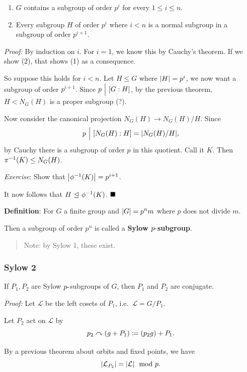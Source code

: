 \begin{enumerate}
\def\labelenumi{\arabic{enumi}.}
\tightlist
\item
  \(G\) contains a subgroup of order \(p^i\) for every
  \(1 \leq i \leq n\).
\item
  Every subgroup \(H\) of order \(p^i\) where \(i < n\) is a normal
  subgroup in a subgroup of order \(p^{i+1}\).
\end{enumerate}

\emph{Proof:} By induction on \(i\). For \(i=1\), we know this by
Cauchy's theorem. If we show (2), that shows (1) as a consequence.

So suppose this holds for \(i < n\). Let \(H \leq G\) where
\({\left\lvert {H} \right\rvert} = p^i\), we now want a subgroup of order \(p^{i+1}\). Since
\(p{~\Bigm| ~} [G: H]\), by the previous theorem, \(H < N_G(H)\) is a
proper subgroup (?).

Now consider the canonical projection \(N_G(H) \to N_G(H) /H\). Since \[
p {~\Bigm| ~} [N_G(H) : H] = {\left\lvert {N_G(H)/ H} \right\rvert}
,\] by Cauchy there is a subgroup of order \(p\) in this quotient. Call
it \(K\). Then \(\pi^{-1}(K) \leq N_G(H)\).

\emph{Exercise}: Show that \({\left\lvert {\phi^{-1}(K)} \right\rvert} = p^{i+1}\).

It now follows that \(H {~\trianglelefteq~} \phi^{-1}(K)\). \(\qed\)

\textbf{Definition}: For \(G\) a finite group and \({\left\lvert {G} \right\rvert} = p^n m\)
where \(p\) does not divide \(m\).

Then a subgroup of order \(p^n\) is called a \textbf{Sylow
\(p{\hbox{-}}\)subgroup}.

\begin{quote}
Note: by Sylow 1, these exist.
\end{quote}

\hypertarget{sylow-2}{%
\subsubsection{Sylow 2}\label{sylow-2}}

If \(P_1, P_2\) are Sylow \(p{\hbox{-}}\)subgroups of \(G\), then \(P_1\) and
\(P_2\) are conjugate.

\emph{Proof:} Let \(\mathcal L\) be the left cosets of \(P_1\),
i.e.~\(\mathcal L = G/P_1\).

Let \(P_2\) act on \(\mathcal L\) by \[
p_2 \curvearrowright (g + P_1) \coloneqq (p_2g) + P_1
.\]

By a previous theorem about orbits and fixed points, we have \[
{\left\lvert {\mathcal L_{P_2}} \right\rvert} = {\left\lvert {\mathcal L} \right\rvert} \mod p.
\]


